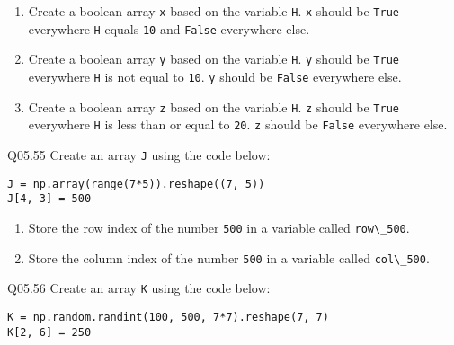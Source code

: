 \documentclass{book}
\newcommand{\passthrough}[1]{#1}
\begin{document}
\begin{enumerate}
\def\labelenumi{(\alph{enumi})}
\item
  Create a boolean array \passthrough{\lstinline!x!} based on the
  variable \passthrough{\lstinline!H!}. \passthrough{\lstinline!x!}
  should be \passthrough{\lstinline!True!} everywhere
  \passthrough{\lstinline!H!} equals \passthrough{\lstinline!10!} and
  \passthrough{\lstinline!False!} everywhere else.
\item
  Create a boolean array \passthrough{\lstinline!y!} based on the
  variable \passthrough{\lstinline!H!}. \passthrough{\lstinline!y!}
  should be \passthrough{\lstinline!True!} everywhere
  \passthrough{\lstinline!H!} is not equal to
  \passthrough{\lstinline!10!}. \passthrough{\lstinline!y!} should be
  \passthrough{\lstinline!False!} everywhere else.
\item
  Create a boolean array \passthrough{\lstinline!z!} based on the
  variable \passthrough{\lstinline!H!}. \passthrough{\lstinline!z!}
  should be \passthrough{\lstinline!True!} everywhere
  \passthrough{\lstinline!H!} is less than or equal to
  \passthrough{\lstinline!20!}. \passthrough{\lstinline!z!} should be
  \passthrough{\lstinline!False!} everywhere else.
\end{enumerate}

Q05.55 Create an array \passthrough{\lstinline!J!} using the code below:

\begin{lstlisting}
J = np.array(range(7*5)).reshape((7, 5))
J[4, 3] = 500
\end{lstlisting}

\begin{enumerate}
\def\labelenumi{(\alph{enumi})}
\item
  Store the row index of the number \passthrough{\lstinline!500!} in a
  variable called \passthrough{\lstinline!row\_500!}.
\item
  Store the column index of the number \passthrough{\lstinline!500!} in
  a variable called \passthrough{\lstinline!col\_500!}.
\end{enumerate}

Q05.56 Create an array \passthrough{\lstinline!K!} using the code below:

\begin{lstlisting}
K = np.random.randint(100, 500, 7*7).reshape(7, 7)
K[2, 6] = 250
\end{lstlisting}
\end{document}
